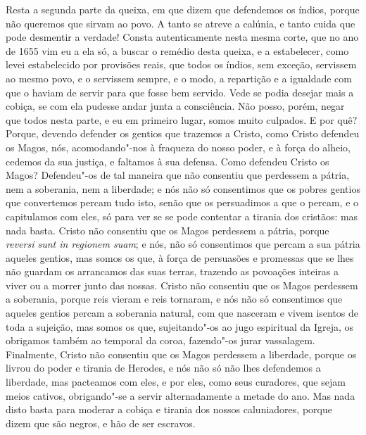 Resta a segunda parte da queixa, em que dizem que defendemos os índios,
porque não queremos que sirvam ao povo. A tanto se atreve a calúnia, e
tanto cuida que pode desmentir a verdade! Consta autenticamente nesta
mesma corte, que no ano de 1655 vim eu a ela só, a buscar o remédio
desta queixa, e a estabelecer, como levei estabelecido por provisões
reais, que todos os índios, sem exceção, servissem ao mesmo povo, e o
servissem sempre, e o modo, a repartição e a igualdade com que o haviam
de servir para que fosse bem servido. Vede se podia desejar mais a
cobiça, se com ela pudesse andar junta a consciência. Não posso, porém,
negar que todos nesta parte, e eu em primeiro lugar, somos muito
culpados. E por quê? Porque, devendo defender os gentios que trazemos a
Cristo, como Cristo defendeu os Magos, nós, acomodando"-nos à fraqueza do
nosso poder, e à força do alheio, cedemos da sua justiça, e faltamos à
sua defensa. Como defendeu Cristo os Magos? Defendeu"-os de tal maneira
que não consentiu que perdessem a pátria, nem a soberania, nem a
liberdade; e nós não só consentimos que os pobres gentios que
convertemos percam tudo isto, senão que os persuadimos a que o percam, e
o capitulamos com eles, só para ver se se pode contentar a tirania dos
cristãos: mas nada basta. Cristo não consentiu que os
Magos perdessem a pátria, porque \emph{reversi sunt in regionem suam}; e nós, não só consentimos que percam a sua pátria aqueles
gentios, mas somos os que, à força de persuasões e promessas que se lhes
não guardam os arrancamos das suas terras, trazendo as povoações
inteiras a viver ou a morrer junto das nossas. Cristo não consentiu que
os Magos perdessem a soberania, porque reis vieram e reis tornaram, e
nós não só consentimos que aqueles gentios percam a soberania natural,
com que nasceram e vivem isentos de toda a sujeição, mas somos os que,
sujeitando"-os ao jugo espiritual da Igreja, os obrigamos também ao
temporal da coroa, fazendo"-os jurar vassalagem. Finalmente, Cristo não
consentiu que os Magos perdessem a liberdade, porque os livrou do poder
e tirania de Herodes, e nós não só não lhes defendemos a liberdade, mas
pacteamos com eles, e por eles, como seus curadores, que sejam meios
cativos, obrigando"-se a servir alternadamente a metade do ano. Mas nada
disto basta para moderar a cobiça e tirania dos nossos caluniadores,
porque dizem que são negros, e hão de ser escravos.

